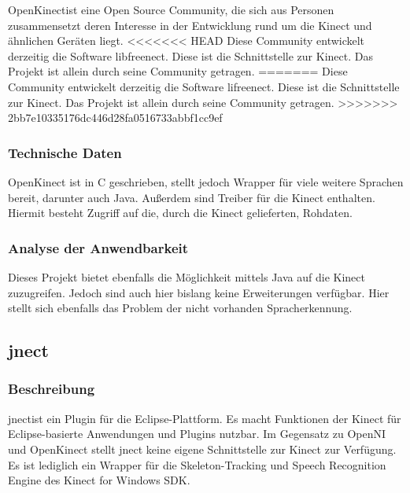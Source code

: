 OpenKinect\footnotemark[11] ist eine Open Source Community, die sich aus Personen zusammensetzt deren Interesse in der Entwicklung rund um die Kinect und \"ahnlichen Ger\"aten liegt.
<<<<<<< HEAD
Diese Community entwickelt derzeitig die Software libfreenect. Diese ist die Schnittstelle zur Kinect. Das Projekt ist allein durch seine Community getragen.
=======
Diese Community entwickelt derzeitig die Software lifreenect. Diese ist die Schnittstelle zur Kinect. Das Projekt ist allein durch seine Community getragen.
>>>>>>> 2bb7e10335176dc446d28fa0516733abbf1cc9ef

\subsubsection{Technische Daten}

OpenKinect ist in C geschrieben, stellt jedoch Wrapper f\"ur viele weitere Sprachen bereit\footnotemark[12], darunter auch Java. Außerdem sind Treiber f\"ur die Kinect enthalten.
Hiermit besteht Zugriff auf die, durch die Kinect gelieferten, Rohdaten.


\subsubsection{Analyse der Anwendbarkeit}

Dieses Projekt bietet ebenfalls die M\"oglichkeit mittels Java auf die Kinect zuzugreifen. Jedoch sind auch hier bislang keine Erweiterungen verf\"ugbar. Hier stellt sich ebenfalls das Problem der nicht vorhanden Spracherkennung.


\subsection{jnect}
\label{subsec:jnect}

\subsubsection{Beschreibung}

jnect\footnotemark[13] ist ein Plugin f\"ur die Eclipse-Plattform. Es macht Funktionen der Kinect f\"ur Eclipse-basierte Anwendungen und Plugins nutzbar. 
Im Gegensatz zu OpenNI und OpenKinect stellt jnect keine eigene Schnittstelle zur Kinect zur Verf\"ugung. Es ist lediglich ein Wrapper f\"ur die Skeleton-Tracking und Speech Recognition Engine des Kinect for Windows SDK\footnotemark[14]. 

